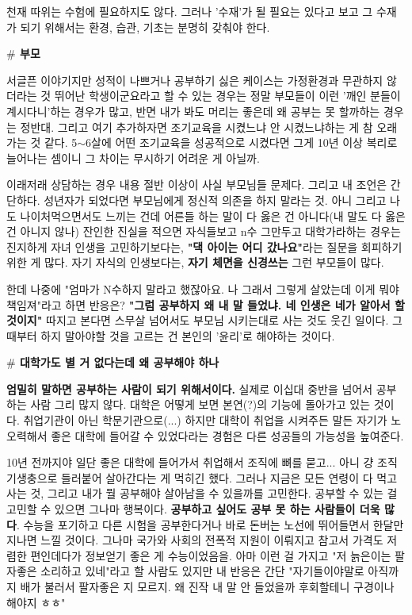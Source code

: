 천재 따위는 수험에 필요하지도 않다. 그러나 '수재'가 될 필요는 있다고 보고
그 수재가 되기 위해서는 환경, 습관, 기초는 분명히 갖춰야 한다.
\vspace{5mm}

\textbf{$\#$ 부모}
\vspace{5mm}

서글픈 이야기지만 성적이 나쁘거나 공부하기 싫은 케이스는 가정환경과 무관하지 않더라는 것
뛰어난 학생이군요라고 할 수 있는 경우는 정말 부모들이 이런 '깨인 분들이 계시다니'하는 경우가 많고,
반면 내가 봐도 머리는 좋은데 왜 공부는 못 할까하는 경우는 정반대.
그리고 여기 추가하자면 조기교육을 시켰느냐 안 시켰느냐하는 게 참 오래 가는 것 같다.
5$\sim$6살에 어떤 조기교육을 성공적으로 시켰다면 그게 10년 이상 복리로 늘어나는 셈이니 그 차이는 무시하기 어려운 게 아닐까.
\vspace{5mm}

이래저래 상담하는 경우 내용 절반 이상이 사실 부모님들 문제다.
그리고 내 조언은 간단하다. 성년자가 되었다면 부모님에게 정신적 의존을 하지 말라는 것.
아니 그리고 나도 나이처먹으면서도 느끼는 건데 어른들 하는 말이 다 옳은 건 아니다(내 말도 다 옳은 건 아니지 않나)
잔인한 진실을 적으면 자식들보고 n수 그만두고 대학가라하는 경우는
진지하게 자녀 인생을 고민하기보다는, \textbf{"댁 아이는 어디 갔나요"}라는 질문을 회피하기 위한 게 많다.
자기 자식의 인생보다는, \textbf{자기 체면을 신경쓰는} 그런 부모들이 많다.
\vspace{5mm}

한데 나중에 "엄마가 N수하지 말라고 했잖아요. 나 그래서 그렇게 살았는데 이게 뭐야 책임져"라고 하면 반응은?
\textbf{"그럼 공부하지 왜 내 말 들었냐. 네 인생은 네가 알아서 할 것이지"}
따지고 본다면 스무살 넘어서도 부모님 시키는대로 사는 것도 웃긴 일이다.
그 때부터 하지 말아야할 것을 고르는 건 본인의 '윤리'로 해야하는 것이다.
\vspace{5mm}

\textbf{$\#$ 대학가도 별 거 없다는데 왜 공부해야 하나}
\vspace{5mm}

\textbf{엄밀히 말하면 공부하는 사람이 되기 위해서이다.}
실제로 이십대 중반을 넘어서 공부하는 사람 그리 많지 않다.
대학은 어떻게 보면 본연(?)의 기능에 돌아가고 있는 것이다. 취업기관이 아닌 학문기관으로(...)
하지만 대학이 취업을 시켜주든 말든 자기가 노오력해서 좋은 대학에 들어갈 수 있었다라는 경험은 다른 성공들의 가능성을 높여준다.
\vspace{5mm}

10년 전까지야 일단 좋은 대학에 들어가서 취업해서 조직에 뼈를 묻고... 아니 걍 조직 기생충으로 들러붙어 살아간다는 게 먹히긴 했다.
그러나 지금은 모든 연령이 다 먹고사는 것, 그리고 내가 뭘 공부해야 살아남을 수 있을까를 고민한다.
공부할 수 있는 걸 고민할 수 있으면 그나마 행복이다. \textbf{공부하고 싶어도 공부 못 하는 사람들이 더욱 많다}.
수능을 포기하고 다른 시험을 공부한다거나 바로 돈버는 노선에 뛰어들면서 한달만 지나면 느낄 것이다.
그나마 국가와 사회의 전폭적 지원이 이뤄지고 참고서 가격도 저렴한 편인데다가 정보얻기 좋은 게 수능이었음을.
아마 이런 걸 가지고 "저 늙은이는 팔자좋은 소리하고 있네"라고 할 사람도 있지만 내 반응은 간단
"자기들이야말로 아직까지 배가 불러서 팔자좋은 지 모르지. 왜 진작 내 말 안 들었을까 후회할테니 구경이나 해야지 ㅎㅎ"
\vspace{5mm}

